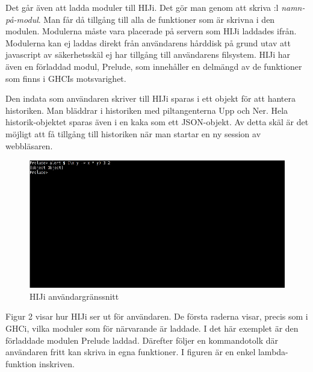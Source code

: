 Det går även att ladda moduler till HIJi. Det gör man genom att skriva :l \emph{namn-på-modul}. Man får då tillgång till alla de funktioner som är skrivna i den modulen. Modulerna måste vara placerade på servern som HIJi laddades ifrån. Modulerna kan ej laddas direkt från användarens hårddisk på grund utav att javascript av säkerhetsskäl ej har tillgång till användarens filsystem. HIJi har även en förladdad modul, Prelude, som innehåller en delmängd av de funktioner som finns i GHCIs motsvarighet. 

Den indata som användaren skriver till HIJi sparas i ett objekt för att hantera historiken. Man bläddrar i historiken med piltangenterna Upp och Ner. Hela historik-objektet sparas även i en kaka som ett JSON-objekt. Av detta skäl är det möjligt att få tillgång till historiken när man startar en ny session av webbläsaren.


\begin{figure}[H]
    \begin{center}
        \includegraphics[width=1\textwidth]{hiji_screen3.png}
        \caption{HIJi användargränssnitt}
    \end{center}
\end{figure}

Figur 2 visar hur HIJi ser ut för användaren. De första raderna visar, precis som i GHCi, vilka moduler som för närvarande är laddade. I det här exemplet är den förladdade modulen Prelude laddad. Därefter följer en kommandotolk där användaren fritt kan skriva in egna funktioner. I figuren är en enkel lambda-funktion inskriven.


